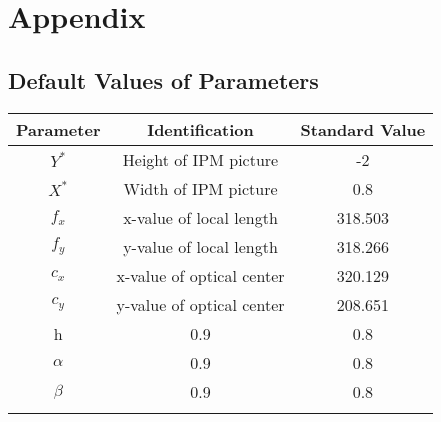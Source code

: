 %
\appendix 
\chapter{Appendix} 
\section{Default Values of Parameters} 


\begin{center}
  \begin{tabular}{ | c | c | c | }
    \hline
    Parameter & Identification				  &  Standard Value   \\ \hline
    $ Y^{*} $ & Height of IPM picture  		  &  -2   \\ \hline
    $ X^{*} $ & Width of IPM picture  		  &  0.8  \\ \hline
    $ f_{x} $ & x-value of local length 	  &  318.503  \\ \hline
    $ f_{y} $ & y-value of local length 	  &  318.266  \\ \hline
    $ c_{x} $ & x-value of optical center	  &  320.129  \\ \hline
    $ c_{y} $ & y-value of optical center	  &  208.651  \\ \hline
    h		  & 0.9 &  0.8  \\ \hline
    $ \alpha $& 0.9 &  0.8  \\ \hline
    $ \beta $ & 0.9 &  0.8  \\ \hline

\label{tab:parameters}
  \end{tabular}
\end{center}

%